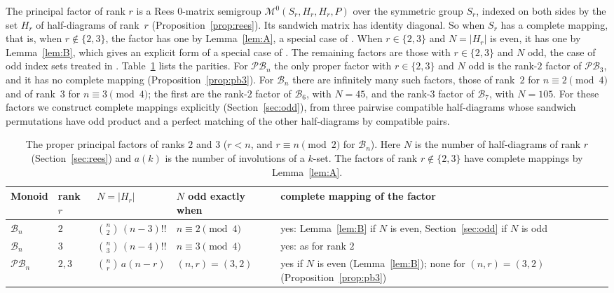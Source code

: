 \documentclass[11pt]{article}
\theoremstyle{remark}
\newcommand{\B}{\mathcal B}
\newcommand{\PB}{\mathcal{PB}}
\newcommand{\M}{\mathcal M}
\begin{document}
The principal factor of rank $r$ is a Rees $0$-matrix semigroup
$\M^0(S_r,H_r,H_r,P)$ over the symmetric group $S_r$, indexed on both sides by
the set $H_r$ of half-diagrams of rank~$r$ (Proposition~\ref{prop:rees}). Its
sandwich matrix has identity diagonal. So when $S_r$ has a complete mapping,
that is, when $r\notin\{2,3\}$, the factor has one by Lemma~\ref{lem:A}, a
special case of \cite[Theorem~6.2]{abchk}. When $r\in\{2,3\}$ and $N=|H_r|$ is
even, it has one by Lemma~\ref{lem:B}, which gives an explicit form of a
special case of \cite[Corollary~7.6]{abchk}. The remaining factors are those
with $r\in\{2,3\}$ and $N$ odd, the case of odd index sets treated in
\cite[Section~7]{abchk}. Table~\ref{tab:cases} lists the parities. For $\PB_n$
the only proper factor with $r\in\{2,3\}$ and $N$ odd is the rank-$2$ factor
of $\PB_3$, and it has no complete mapping (Proposition~\ref{prop:pb3}). For
$\B_n$ there are infinitely many such factors, those of rank~$2$ for
$n\equiv2\pmod4$ and of rank~$3$ for $n\equiv3\pmod4$; the first are the
rank-$2$ factor of $\B_6$, with $N=45$, and the rank-$3$ factor of $\B_7$, with
$N=105$. For these factors we construct complete mappings explicitly
(Section~\ref{sec:odd}), from three pairwise compatible half-diagrams whose
sandwich permutations have odd product and a perfect matching of the other
half-diagrams by compatible pairs.

\begin{table}[ht]\centering\small
\begin{tabular}{@{}l l l l >{\raggedright\arraybackslash}p{}@{}}
\toprule
Monoid & rank $r$ & $N=|H_r|$ & $N$ odd exactly when & complete mapping of the factor\\
\midrule
$\B_n$ & $2$ & $\binom n2\,(n-3)!!$ & $n\equiv2\pmod4$ &
 yes: Lemma~\ref{lem:B} if $N$ is even, Section~\ref{sec:odd} if $N$ is odd\\\addlinespace
$\B_n$ & $3$ & $\binom n3\,(n-4)!!$ & $n\equiv3\pmod4$ &
 yes: as for rank $2$\\\addlinespace
$\PB_n$ & $2,3$ & $\binom nr\,a(n-r)$ & $(n,r)=(3,2)$ &
 yes if $N$ is even (Lemma~\ref{lem:B}); none for $(n,r)=(3,2)$
 (Proposition~\ref{prop:pb3})\\
\bottomrule
\end{tabular}
\caption{The proper principal factors of ranks $2$ and $3$ ($r<n$, and
$r\equiv n\pmod 2$ for $\B_n$). Here $N$ is the number of half-diagrams of
rank $r$ (Section~\ref{sec:rees}) and $a(k)$ is the number of involutions of a
$k$-set. The factors of rank $r\notin\{2,3\}$ have complete mappings by
Lemma~\ref{lem:A}.}
\label{tab:cases}
\end{table}
\end{document}
